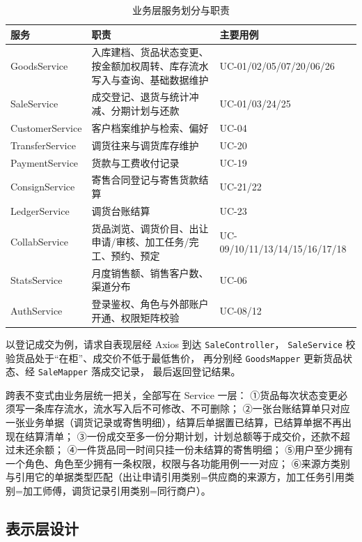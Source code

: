 \documentclass[12pt, a4paper]{ctexart}
\newcommand{\code}[1]{\texttt{\small #1}}
\begin{document}
\begin{table}[H]
\centering
\small
\caption{业务层服务划分与职责}
\label{tab:services}
\begin{tabularx}{\textwidth}{@{}l X l@{}}
\toprule
服务 & 职责 & 主要用例 \\
\midrule
GoodsService & 入库建档、货品状态变更、按金额加权周转、库存流水写入与查询、基础数据维护 & UC-01/02/05/07/20/06/26 \\
SaleService & 成交登记、退货与统计冲减、分期计划与还款 & UC-01/03/24/25 \\
CustomerService & 客户档案维护与检索、偏好 & UC-04 \\
TransferService & 调货往来与调货库存维护 & UC-20 \\
PaymentService & 货款与工费收付记录 & UC-19 \\
ConsignService & 寄售合同登记与寄售货款结算 & UC-21/22 \\
LedgerService & 调货台账结算 & UC-23 \\
CollabService & 货品浏览、调货价目、出让申请/审核、加工任务/完工、预约、预定 & UC-09/10/11/13/14/15/16/17/18 \\
StatsService & 月度销售额、销售客户数、渠道分布 & UC-06 \\
AuthService & 登录鉴权、角色与外部账户开通、权限矩阵校验 & UC-08/12 \\
\bottomrule
\end{tabularx}
\end{table}

以登记成交为例，请求自表现层经 Axios 到达 \code{SaleController}，
\code{SaleService} 校验货品处于“在柜”、成交价不低于最低售价，
再分别经 \code{GoodsMapper} 更新货品状态、经 \code{SaleMapper} 落成交记录，
最后返回登记结果。

跨表不变式由业务层统一把关，全部写在 Service 一层：
①货品每次状态变更必须写一条库存流水，流水写入后不可修改、不可删除；
②一张台账结算单只对应一张业务单据（调货记录或寄售明细），结算后单据置已结算，已结算单据不再出现在结算清单；
③一份成交至多一份分期计划，计划总额等于成交价，还款不超过未还余额；
④一件货品同一时间只挂一份未结算的寄售明细；
⑤用户至少拥有一个角色、角色至少拥有一条权限，权限与各功能用例一一对应；
⑥来源方类别与引用它的单据类型匹配（出让申请引用类别=供应商的来源方，加工任务引用类别=加工师傅，调货记录引用类别=同行商户）。

\subsection{表示层设计}
\end{document}
